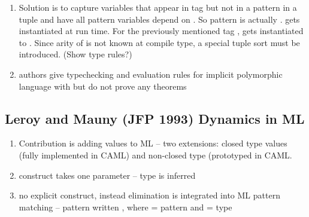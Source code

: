 \documentclass[12pt]{article}	%
\begin{document}
\begin{enumerate}
	\item Solution is to capture variables that appear in tag but not in a pattern in a tuple  and have all pattern variables depend on . So pattern  is actually  .  gets instantiated at run time. For the previously mentioned tag ,  gets instantiated to . Since arity of  is not known at compile type, a special tuple sort must be introduced. (Show type rules?)
	\item authors give typechecking and evaluation rules for implicit polymorphic language with \Dynamic but do not prove any theorems
	
	
\end{enumerate}

\subsection*{Leroy and Mauny (JFP 1993) Dynamics in ML}
\begin{enumerate}
	\item Contribution is adding \Dynamic values to ML -- two extensions: closed type \Dynamic values (fully implemented in CAML) and non-closed type (prototyped in CAML.
	\item \dynamic construct takes one parameter -- type is inferred
	\item no explicit \typecase construct, instead \Dynamic elimination is integrated into ML pattern matching -- pattern written , where  = pattern and  = type
\end{enumerate}
\end{document}
